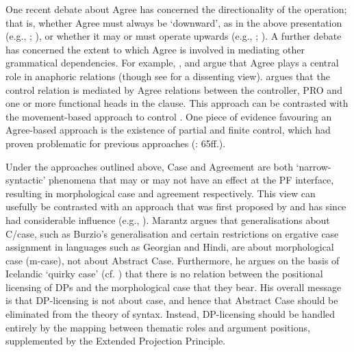\documentclass[output=paper]{langsci/langscibook}
\begin{document}
One recent debate about Agree has concerned the directionality of the operation; that is, whether Agree must always be ‘downward’, as in the above presentation (e.g., \citealt{Chomsky2000,Chomsky2001Derivation}; \citealt{Preminger2013}), or whether it may or must operate upwards (e.g., \citealt{Zeijlstra2012}; \citealt{Ackema2018}). A further debate has concerned the extent to which Agree is involved in mediating other grammatical dependencies. For example, \citet{Reuland2001}, \citet{Hicks2009} and \citet{Rooryck2011} argue that Agree plays a central role in anaphoric relations (though see \citealt{Safir2014} for a dissenting view). \citet{Landau2000} argues that the control relation is mediated by Agree relations between the controller, PRO and one or more functional heads in the clause. This approach can be contrasted with the movement-based approach to control \citep{Hornstein1999,Hornstein2010}. One piece of evidence favouring an Agree-based approach is the existence of partial and finite control, which had proven problematic for previous approaches (\citealt{Landau2013}: 65ff.).

Under the approaches outlined above, Case and Agreement are both ‘narrow-syntactic’ phenomena that may or may not have an effect at the PF interface, resulting in morphological case and agreement respectively. This view can usefully be contrasted with an approach that was first proposed by \citet{Marantz1991} and has since had considerable influence (e.g., \citealt{Harley1995,Schütze1997,McFadden2004,Bobaljik2008,Baker2010,Titov2012}). Marantz argues that generalisations about C/case, such as Burzio’s generalisation \citep{Burzio1986} and certain restrictions on ergative case assignment in languages such as Georgian and Hindi, are about morphological case (m-case), not about Abstract Case. Furthermore, he argues on the basis of Icelandic ‘quirky case’ (cf. \citealt{Zaenen1985}) that there is no relation between the positional licensing of DPs and the morphological case that they bear. His overall message is that DP-licensing is not about case, and hence that Abstract Case should be eliminated from the theory of syntax. Instead, DP-licensing should be handled entirely by the mapping between thematic roles and argument positions, supplemented by the Extended Projection Principle.
\end{document}
